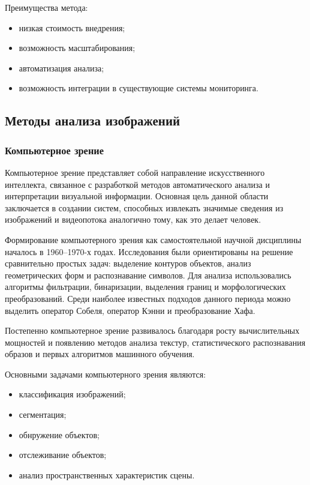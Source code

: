 Преимущества метода:

\begin{itemize}
	\item низкая стоимость внедрения;
	\item возможность масштабирования;
	\item автоматизация анализа;
	\item возможность интеграции в существующие системы мониторинга.
\end{itemize}

\subsection{Методы анализа изображений}

\subsubsection{Компьютерное зрение}

Компьютерное зрение представляет собой направление искусственного интеллекта, связанное с разработкой методов автоматического анализа и интерпретации визуальной информации. Основная цель данной области заключается в создании систем, способных извлекать значимые сведения из изображений и видеопотока аналогично тому, как это делает человек.

Формирование компьютерного зрения как самостоятельной научной дисциплины началось в 1960--1970-х годах. Исследования были ориентированы на решение сравнительно простых задач: выделение контуров объектов, анализ геометрических форм и распознавание символов. Для анализа использовались алгоритмы фильтрации, бинаризации, выделения границ и морфологических преобразований. Среди наиболее известных подходов данного периода можно выделить оператор Собеля, оператор Кэнни и преобразование Хафа.

Постепенно компьютерное зрение развивалось благодаря росту вычислительных мощностей и появлению методов анализа текстур, статистического распознавания образов и первых алгоритмов машинного обучения.

Основными задачами компьютерного зрения являются:

\begin{itemize}
	\item классификация изображений;
	\item сегментация;
	\item обнружение объектов;
	\item отслеживание объектов;
	\item анализ пространственных характеристик сцены.
\end{itemize}

